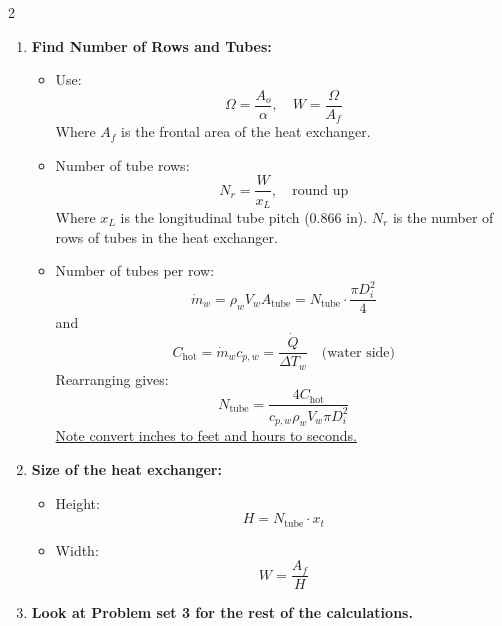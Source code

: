 \begin{multicols*}{2}
\begin{enumerate}
        \item \textbf{Find Number of Rows and Tubes:}
              \begin{itemize}
                  \item Use:
                        \[
                            \Omega = \frac{A_o}{\alpha}, \quad W = \frac{\Omega}{A_f}
                        \]
                        Where $A_f$ is the frontal area of the heat exchanger.
                  \item Number of tube rows:
                        \[
                            N_r = \frac{W}{x_L}, \quad \text{round up}
                        \]
                        Where $x_L$ is the longitudinal tube pitch (0.866 in). $N_r$ is the number of rows of tubes in the heat exchanger.
                  \item Number of tubes per row:
                        \[
                            \dot{m}_{w} = \rho_w V_w A_\text{tube} = N_\text{tube} \cdot \frac{\pi D_i^2}{4}
                        \]
                        and \[
                            C_\text{hot}= \dot{m}_{w} c_{p,w} = \frac{\dot{Q}}{\Delta T_{w}} \quad \text{(water side)}
                        \]
                        Rearranging gives:
                        \[
                            N_\text{tube} = \frac{4C_\text{hot}}{c_{p,w} \rho_w V_w \pi D_i^2}
                        \]
                        \underline{Note convert inches to feet and hours to seconds.}
              \end{itemize}

        \item \textbf{Size of the heat exchanger:}
              \begin{itemize}
                  \item Height:
                        \[
                            H = N_\text{tube} \cdot x_t
                        \]
                  \item Width:
                        \[
                            W = \frac{A_f}{H}
                        \]
              \end{itemize}
        \item \textbf{Look at Problem set 3 for the rest of the calculations.}
    \end{enumerate}

\end{multicols*}
